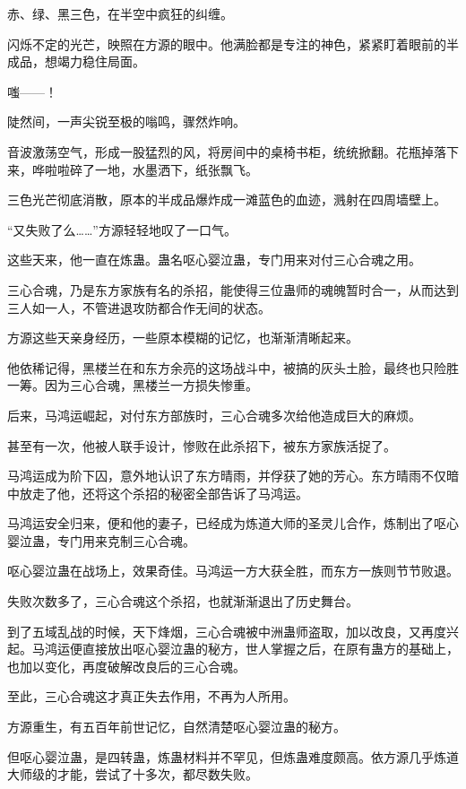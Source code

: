 
\begin{this_body}

赤、绿、黑三色，在半空中疯狂的纠缠。

闪烁不定的光芒，映照在方源的眼中。他满脸都是专注的神色，紧紧盯着眼前的半成品，想竭力稳住局面。

嗤——！

陡然间，一声尖锐至极的嗡鸣，骤然炸响。

音波激荡空气，形成一股猛烈的风，将房间中的桌椅书柜，统统掀翻。花瓶掉落下来，哗啦啦碎了一地，水墨洒下，纸张飘飞。

三色光芒彻底消散，原本的半成品爆炸成一滩蓝色的血迹，溅射在四周墙壁上。

“又失败了么……”方源轻轻地叹了一口气。

这些天来，他一直在炼蛊。蛊名呕心婴泣蛊，专门用来对付三心合魂之用。

三心合魂，乃是东方家族有名的杀招，能使得三位蛊师的魂魄暂时合一，从而达到三人如一人，不管进退攻防都合作无间的状态。

方源这些天亲身经历，一些原本模糊的记忆，也渐渐清晰起来。

他依稀记得，黑楼兰在和东方余亮的这场战斗中，被搞的灰头土脸，最终也只险胜一筹。因为三心合魂，黑楼兰一方损失惨重。

后来，马鸿运崛起，对付东方部族时，三心合魂多次给他造成巨大的麻烦。

甚至有一次，他被人联手设计，惨败在此杀招下，被东方家族活捉了。

马鸿运成为阶下囚，意外地认识了东方晴雨，并俘获了她的芳心。东方晴雨不仅暗中放走了他，还将这个杀招的秘密全部告诉了马鸿运。

马鸿运安全归来，便和他的妻子，已经成为炼道大师的圣灵儿合作，炼制出了呕心婴泣蛊，专门用来克制三心合魂。

呕心婴泣蛊在战场上，效果奇佳。马鸿运一方大获全胜，而东方一族则节节败退。

失败次数多了，三心合魂这个杀招，也就渐渐退出了历史舞台。

到了五域乱战的时候，天下烽烟，三心合魂被中洲蛊师盗取，加以改良，又再度兴起。马鸿运便直接放出呕心婴泣蛊的秘方，世人掌握之后，在原有蛊方的基础上，也加以变化，再度破解改良后的三心合魂。

至此，三心合魂这才真正失去作用，不再为人所用。

方源重生，有五百年前世记忆，自然清楚呕心婴泣蛊的秘方。

但呕心婴泣蛊，是四转蛊，炼蛊材料并不罕见，但炼蛊难度颇高。依方源几乎炼道大师级的才能，尝试了十多次，都尽数失败。


\end{this_body}

